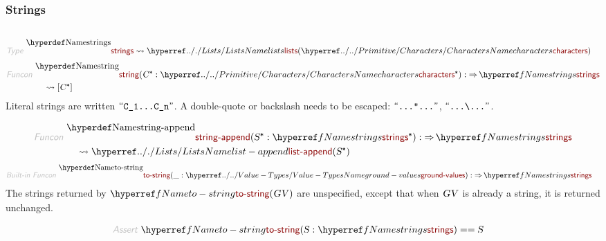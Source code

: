 \subsubsection*{Strings}\hypertarget{strings}{}\label{strings}

\begin{align*}
  [ ~ 
  \KEY{Type} ~ & \NAMEREF{strings} \\
  \KEY{Funcon} ~ & \NAMEREF{string} \\
  \KEY{Funcon} ~ & \NAMEREF{string-append} \\
  \KEY{Funcon} ~ & \NAMEREF{to-string}
  ~ ]
\end{align*}
\begin{align*}
  \KEY{Type} ~  
  & \NAMEDECL{strings}  
  \leadsto \NAMEHYPER{../.}{Lists}{lists}
             ( \NAMEHYPER{../../Primitive}{Characters}{characters} )
\end{align*}
\begin{align*}
  \KEY{Funcon} ~ 
  & \NAMEDECL{string}(\VAR{C}\STAR : \NAMEHYPER{../../Primitive}{Characters}{characters}\STAR) :  \TO \NAMEREF{strings} \\
  & \quad \leadsto [ \VAR{C}\STAR ]
\end{align*}
Literal strings are written $\SHADE{\STRING{C\UNDERSCORE 1.{}.{}.{}C\UNDERSCORE n}}$.
  A double-quote or backslash needs to be escaped: $\strut\textsf{``\texttt{.{}.{}.{}"{}.{}.{}.{}}''}\strut$, $\SHADE{\STRING{.{}.{}.{}\BACKSLASH .{}.{}.{}}}$.

\begin{align*}
  \KEY{Funcon} ~ 
  & \NAMEDECL{string-append}(\VAR{S}\STAR : \NAMEREF{strings}\STAR) :  \TO \NAMEREF{strings} \\
  & \quad \leadsto \NAMEHYPER{../.}{Lists}{list-append}
                     ( \VAR{S}\STAR )
\end{align*}
\begin{align*}
  \KEY{Built-in Funcon} ~ 
  & \NAMEDECL{to-string}(\_ : \NAMEHYPER{../..}{Value-Types}{ground-values}) :  \TO \NAMEREF{strings}
\end{align*}
The strings returned by $\SHADE{\NAMEREF{to-string}
           ( \VAR{GV} )}$ are unspecified, except that when
  $\SHADE{\VAR{GV}}$ is already a string, it is returned unchanged.

\begin{align*}
  \KEY{Assert} ~ 
  & \NAMEREF{to-string}
      ( \VAR{S} : \NAMEREF{strings} ) == 
      \VAR{S}
\end{align*}
